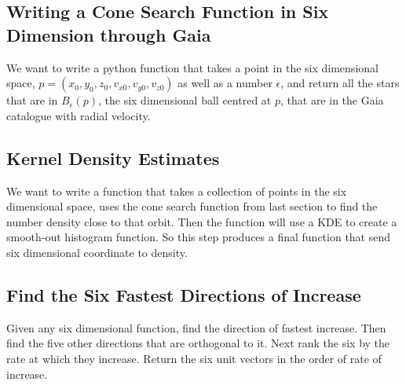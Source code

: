 \documentclass[12pt]{article}
\begin{document}
\subsection*{Writing a Cone Search Function in Six Dimension through Gaia}
We want to write a python function that takes a point in the six dimensional space, $ p = (x_0, y_0, z_0, v_{x0}, v_{y0}, v_{z0})$ as well as a number $\epsilon$, and return all the stars that are in $B_\epsilon(p)$, the six dimensional ball centred at $p$, that are in the Gaia catalogue with radial velocity.
\subsection*{Kernel Density Estimates}
We want to write a function that takes a collection of points in the six dimensional space, uses the cone search function from last section to find the number density close to that orbit. Then the function will use a KDE to create a smooth-out histogram function. So this step produces a final function that send six dimensional coordinate to density.
\subsection*{Find the Six Fastest Directions of Increase}
Given any six dimensional function, find the direction of fastest increase. Then find the five other directions that are orthogonal to it. Next rank the six by the rate at which they increase. Return the six unit vectors in the order of rate of increase.
 
\end{document}
